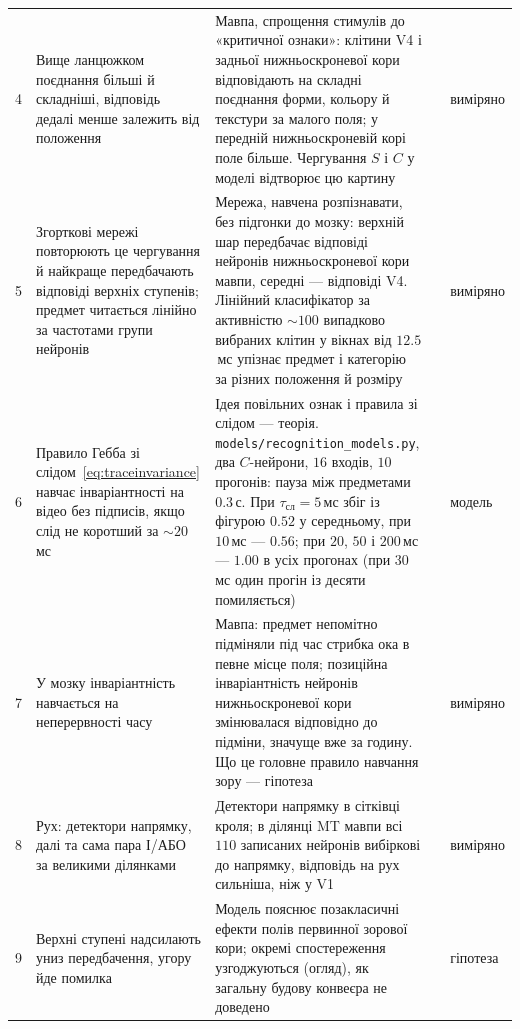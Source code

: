 {\begin{longtable}{>{\raggedright}p{0.5cm}>{\raggedright}p{4.0cm}>{\raggedright}p{5.6cm}>{\raggedright}p{2.3cm}>{\raggedright\arraybackslash}p{1.7cm}}
4 & Вище ланцюжком поєднання більші й складніші, відповідь дедалі менше залежить від положення & Мавпа, спрощення стимулів до «критичної ознаки»: клітини V4 і задньої нижньоскроневої кори відповідають на складні поєднання форми, кольору й текстури за малого поля; у передній нижньоскроневій корі поле більше. Чергування $S$ і $C$ у моделі відтворює цю картину & \cite{KobatakeTanaka1994,Riesenhuber1999} & виміряно \\
5 & Згорткові мережі повторюють це чергування й найкраще передбачають відповіді верхніх ступенів; предмет читається лінійно за частотами групи нейронів & Мережа, навчена розпізнавати, без підгонки до мозку: верхній шар передбачає відповіді нейронів нижньоскроневої кори мавпи, середні --- відповіді V4. Лінійний класифікатор за активністю $\sim100$ випадково вибраних клітин у вікнах від $12.5$\,мс упізнає предмет і категорію за різних положення й розміру & \cite{Fukushima1980,Yamins2014,Hung2005} & виміряно \\
6 & Правило Гебба зі слідом~\eqref{eq:traceinvariance} навчає інваріантності на відео без підписів, якщо слід не коротший за $\sim20$\,мс & Ідея повільних ознак і правила зі слідом --- теорія. \texttt{models/\allowbreak recognition\_models.py}, два $C$-нейрони, $16$ входів, $10$ прогонів: пауза між предметами $0.3$\,с. При $\tau_{\text{сл}}=5$\,мс збіг із фігурою $0.52$ у середньому, при $10$\,мс --- $0.56$; при $20$, $50$ і $200$\,мс --- $1.00$ в усіх прогонах (при $30$\,мс один прогін із десяти помиляється) & \cite{Foldiak1991,WiskottSejnowski2002} & модель \\
7 & У мозку інваріантність навчається на неперервності часу & Мавпа: предмет непомітно підміняли під час стрибка ока в певне місце поля; позиційна інваріантність нейронів нижньоскроневої кори змінювалася відповідно до підміни, значуще вже за годину. Що це головне правило навчання зору --- гіпотеза & \cite{LiDiCarlo2008} & виміряно \\
8 & Рух: детектори напрямку, далі та сама пара І/АБО за великими ділянками & Детектори напрямку в сітківці кроля; в ділянці MT мавпи всі $110$ записаних нейронів вибіркові до напрямку, відповідь на рух сильніша, ніж у V1 & \cite{Barlow1965,Albright1984} & виміряно \\
9 & Верхні ступені надсилають униз передбачення, угору йде помилка & Модель пояснює позакласичні ефекти полів первинної зорової кори; окремі спостереження узгоджуються (огляд), як загальну будову конвеєра не доведено & \cite{RaoBallard1999,Keller2018} & гіпотеза \\

\end{longtable}}
